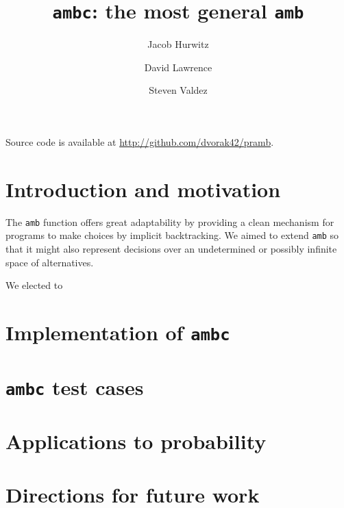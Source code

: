 \documentclass{article}
\title{\texttt{ambc}: the most general \texttt{amb}}
\author{Jacob Hurwitz \and David Lawrence \and Steven Valdez}
\begin{document}
\maketitle

\begin{center}
  Source code is available at \url{http://github.com/dvorak42/pramb}.
\end{center}

\section{Introduction and motivation}

The \texttt{amb} function offers great adaptability by providing a
clean mechanism for programs to make choices by implicit backtracking.
We aimed to extend \texttt{amb} so that it might also represent
decisions over an undetermined or possibly infinite space of
alternatives.

We elected to 

\section{Implementation of \texttt{ambc}}

\section{\texttt{ambc} test cases}

\section{Applications to probability}

\section{Directions for future work}
\end{document}
